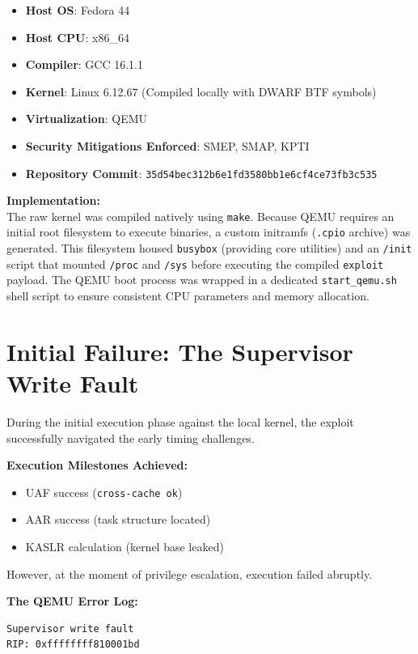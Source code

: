 \documentclass[11pt,a4paper]{article}
\begin{document}
\begin{itemize}
    \item \textbf{Host OS}: Fedora 44
    \item \textbf{Host CPU}: x86\_64
    \item \textbf{Compiler}: GCC 16.1.1
    \item \textbf{Kernel}: Linux 6.12.67 (Compiled locally with DWARF BTF symbols)
    \item \textbf{Virtualization}: QEMU
    \item \textbf{Security Mitigations Enforced}: SMEP, SMAP, KPTI
    \item \textbf{Repository Commit}: \texttt{35d54bec312b6e1fd3580bb1e6cf4ce73fb3c535}
\end{itemize}

\textbf{Implementation:}\\
The raw kernel was compiled natively using \texttt{make}. Because QEMU requires an initial root filesystem to execute binaries, a custom initramfs (\texttt{.cpio} archive) was generated. This filesystem housed \texttt{busybox} (providing core utilities) and an \texttt{/init} script that mounted \texttt{/proc} and \texttt{/sys} before executing the compiled \texttt{exploit} payload. The QEMU boot process was wrapped in a dedicated \texttt{start\_qemu.sh} shell script to ensure consistent CPU parameters and memory allocation.

\clearpage

\section{Initial Failure: The Supervisor Write Fault}
During the initial execution phase against the local kernel, the exploit successfully navigated the early timing challenges. 

\textbf{Execution Milestones Achieved:}
\begin{itemize}
    \item UAF success (\texttt{cross-cache ok})
    \item AAR success (task structure located)
    \item KASLR calculation (kernel base leaked)
\end{itemize}

However, at the moment of privilege escalation, execution failed abruptly. 

\textbf{The QEMU Error Log:}
\begin{lstlisting}[language=bash]
Supervisor write fault
RIP: 0xffffffff810001bd
\end{lstlisting}
\end{document}
